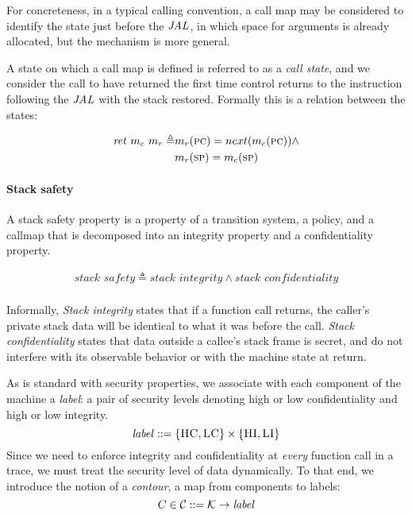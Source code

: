 \documentclass[acmsmall,review,anonymous]{acmart}\settopmatter{printfolios=true,printccs=false,printacmref=false}
\begin{document}
For concreteness, in a typical calling convention, a call map may be
considered to identify the state just before the \(\mathit{JAL}\), in which
space for arguments is already allocated, but the mechanism is more
general.

A state on which a call map is defined is referred to as a {\it call
  state}, and we consider the call to have returned the first time
control returns to the instruction following the \(\mathit{JAL}\) with the
stack restored. Formally this is a relation between the states:
    
\[\begin{split}
\mathit{ret}\ m_c\ m_r \triangleq & m_r(\textsc{pc}) = next(m_c(\textsc{pc})) \land \\
& m_r(\textsc{sp}) = m_c(\textsc{sp})
\end{split}\]


\paragraph*{Stack safety}
  
A stack safety property is a property of a transition system, a
policy, and a callmap that is decomposed into an integrity property and a
confidentiality property.

    \[\begin{split}
      \textit{stack safety} \triangleq \textit{stack integrity} \land \textit{stack confidentiality} \\
    \end{split}\]

 Informally, {\it Stack
  integrity} states that if a function call returns, the caller's
private stack data will be identical to what it was before the
call. {\it Stack confidentiality} states that data outside a callee's
stack frame is secret, and do not interfere with its observable
behavior or with the machine state at return.

As is standard with security properties, we associate with each
component of the machine a {\em label}: a pair of security levels
denoting high or low confidentiality and high or low integrity.
%
\[\mathit{label} ::= \{\textsc{HC},\textsc{LC}\} \times \{\textsc{HI},\textsc{LI}\}\]
%
Since we need to enforce integrity and confidentiality at {\em every}
function call in a trace, we must treat the security level of data
dynamically. To that end, we introduce the notion of a {\em contour},
a map from components to labels:
%
\[C \in {\mathcal C} ::= {\mathcal K} \rightarrow \mathit{label}\]
\end{document}
